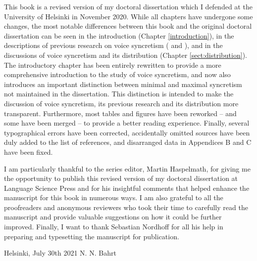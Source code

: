 \addchap{\lsPrefaceTitle}
This book is a revised version of my doctoral dissertation which I defended at the University of Helsinki in November 2020. While all chapters have undergone some changes, the most notable differences between this book and the original doctoral dissertation can be seen in the introduction (Chapter \ref{introduction}), in the descriptions of previous research on voice syncretism ( and ), and in the discussions of voice syncretism and its distribution (Chapter \ref{sect:distribution}). The introductory chapter has been entirely rewritten to provide a more comprehensive introduction to the study of voice syncretism, and now also introduces an important distinction between minimal and maximal syncretism not maintained in the dissertation. This distinction is intended to make the discussion of voice syncretism, its previous research and its distribution more transparent. Furthermore, most tables and figures have been reworked -- and some have been merged -- to provide a better reading experience. Finally, several typographical errors have been corrected, accidentally omitted sources have been duly added to the list of references, and disarranged data in Appendices B and C have been fixed.

I am particularly thankful to the series editor, Martin Haspelmath, for giving me the opportunity to publish this revised version of my doctoral dissertation at Language Science Press and for his insightful comments that helped enhance the manuscript for this book in numerous ways. I am also grateful to all the proofreaders and anonymous reviewers who took their time to carefully read the manuscript and provide valuable suggestions on how it could be further improved. Finally, I want to thank Sebastian Nordhoff for all his help in preparing and typesetting the manuscript for publication.

\bigskip

\noindent Helsinki, July 30th 2021 \hfill N. N. Bahrt
